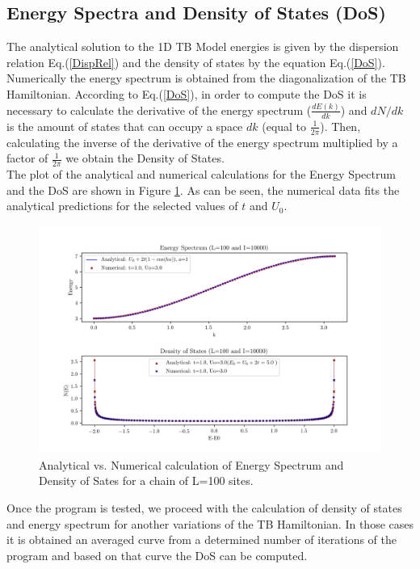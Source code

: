 \documentclass[12pt]{article}
\begin{document}
\subsection{Energy Spectra and Density of States (DoS)}
The analytical solution to the 1D TB Model energies is given by the dispersion relation Eq.(\ref{DispRel}) and the density of states by the equation Eq.(\ref{DoS}).\\

Numerically the energy spectrum is obtained from the diagonalization of the TB Hamiltonian. According to Eq.(\ref{DoS}), in order to compute the DoS it is necessary to calculate the derivative of the energy spectrum ($\frac{dE(k)}{dk}$) and $dN/dk$ is the amount of states that can occupy a space $dk$ (equal to $\frac{1}{2\pi}$). Then, calculating the inverse of the derivative of the energy spectrum multiplied by a factor of $\frac{1}{2\pi}$ we obtain the Density of States.\\

The plot of the analytical and numerical calculations for the Energy Spectrum and the DoS are shown in Figure \ref{f1}. As can be seen, the numerical data fits the analytical predictions for the selected values of $t$ and $U_{0}$.

\begin{figure}[ht]
    \centering
    \includegraphics[scale=0.65]{EDOSCC100.png}
    \caption{Analytical vs. Numerical calculation of Energy Spectrum and Density of Sates for a chain of L=100 sites.}
    \label{f1}
\end{figure}

Once the program is tested, we proceed with the calculation of density of states and energy spectrum for another variations of the TB Hamiltonian. In those cases it is obtained an averaged curve from a determined number of iterations of the program and based on that curve the DoS can be computed.
\end{document}
